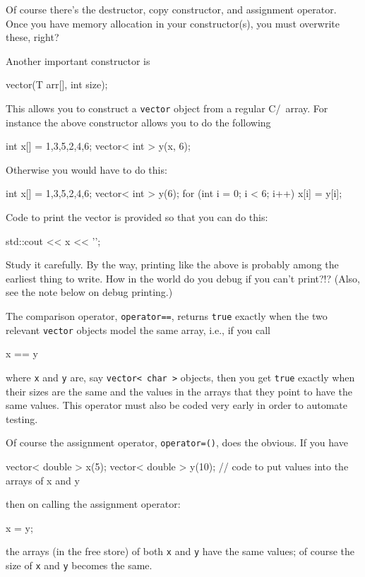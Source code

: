 Of course there's the destructor, copy constructor, and assignment
operator.
Once you have memory allocation in your constructor(s), you must
overwrite these, right?

Another important constructor is
\begin{console}[fontsize=\footnotesize]
vector(T arr[], int size);
\end{console}
This allows you to construct a \verb!vector! object from a regular
C/\cpp\ array. For instance the above
constructor allows you to do the following
\begin{console}[fontsize=\footnotesize]
int x[] = {1,3,5,2,4,6};
vector< int > y(x, 6);
\end{console}
Otherwise you would have to do this:
\begin{console}[fontsize=\footnotesize]
int x[] = {1,3,5,2,4,6};
vector< int > y(6);
for (int i = 0; i < 6; i++)
{
    x[i] = y[i]; 
}
\end{console}

Code to print the vector is provided so that you can do this:
\begin{console}[fontsize=\footnotesize]
std::cout << x << '\n';
\end{console}
Study it carefully.
By the way, printing like the above is probably
among the earliest thing to write. 
How in the world do you debug if you can't print?!?
(Also, see the note below on debug printing.)

The comparison operator, \verb!operator==!, returns \verb!true!
exactly when the two relevant \verb!vector! objects
model the same array, i.e., if you call
\begin{console}[fontsize=\footnotesize]
x == y
\end{console}
where \verb!x! and \verb!y! are, say \verb!vector< char >! objects,
then you get \verb!true! 
exactly when their sizes are the same and the values in the arrays
that they point to have the same values.
This operator must also be coded very early in order to 
automate testing. 

Of course the assignment operator, \verb!operator=()!, does the obvious.
If you have
\begin{console}[fontsize=\footnotesize]
vector< double > x(5);
vector< double > y(10);
// code to put values into the arrays of x and y
\end{console}
then on calling the assignment operator:
\begin{console}[fontsize=\footnotesize]
x = y;
\end{console}
the arrays (in the free store) of both \verb!x! and \verb!y!
have the same values; of course the size of \verb!x! and \verb!y!
becomes the same.

